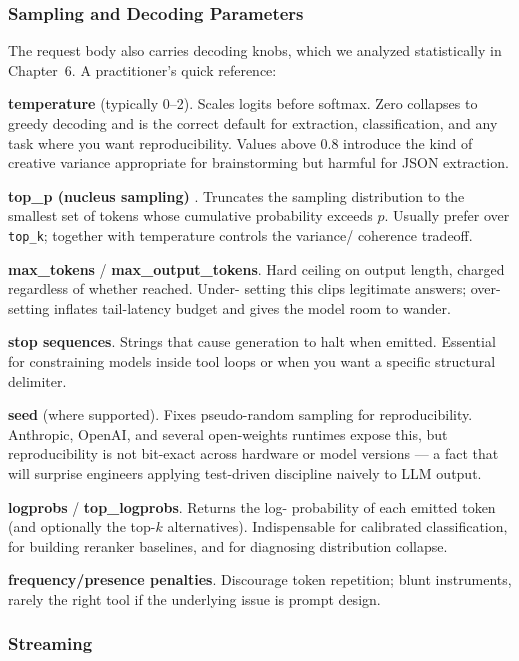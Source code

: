 \subsubsection{Sampling and Decoding Parameters}

The request body also carries decoding knobs, which we analyzed
statistically in Chapter~6. A practitioner's quick reference:

\textbf{temperature} (typically 0--2). Scales logits before
softmax. Zero collapses to greedy decoding and is the correct
default for extraction, classification, and any task where you
want reproducibility. Values above 0.8 introduce the kind of
creative variance appropriate for brainstorming but harmful for
JSON extraction.

\textbf{top\_p (nucleus sampling)} \citep{holtzman2020curious}.
Truncates the sampling distribution to the smallest set of tokens
whose cumulative probability exceeds $p$. Usually prefer over
\texttt{top\_k}; together with temperature controls the variance/
coherence tradeoff.

\textbf{max\_tokens} / \textbf{max\_output\_tokens}. Hard ceiling
on output length, charged regardless of whether reached. Under-
setting this clips legitimate answers; over-setting inflates
tail-latency budget and gives the model room to wander.

\textbf{stop sequences}. Strings that cause generation to halt
when emitted. Essential for constraining models inside tool loops
or when you want a specific structural delimiter.

\textbf{seed} (where supported). Fixes pseudo-random sampling for
reproducibility. Anthropic, OpenAI, and several open-weights
runtimes expose this, but reproducibility is not bit-exact across
hardware or model versions --- a fact that will surprise engineers
applying test-driven discipline naively to LLM output.

\textbf{logprobs} / \textbf{top\_logprobs}. Returns the log-
probability of each emitted token (and optionally the top-$k$
alternatives). Indispensable for calibrated classification, for
building reranker baselines, and for diagnosing distribution
collapse.

\textbf{frequency/presence penalties}. Discourage token
repetition; blunt instruments, rarely the right tool if the
underlying issue is prompt design.

\subsubsection{Streaming}

